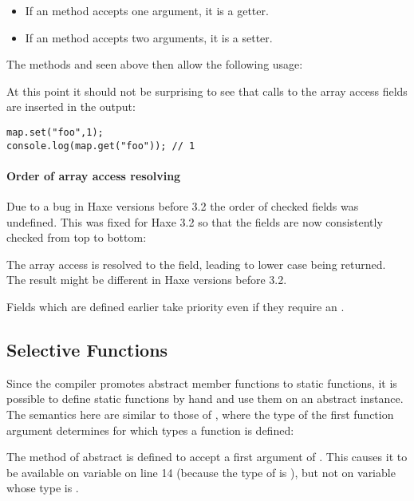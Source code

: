 \begin{itemize}
	\item If an  method accepts one argument, it is a getter.
	\item If an  method accepts two arguments, it is a setter.
\end{itemize}
The methods  and  seen above then allow the following usage:


At this point it should not be surprising to see that calls to the array access fields are inserted in the output:

\begin{lstlisting}
map.set("foo",1);
console.log(map.get("foo")); // 1
\end{lstlisting}

\paragraph{Order of array access resolving}
\label{types-abstract-array-access-order}

Due to a bug in Haxe versions before 3.2 the order of checked  fields was undefined. This was fixed for Haxe 3.2 so that the fields are now consistently checked from top to bottom:


The array access  is resolved to the  field, leading to lower case  being returned. The result might be different in Haxe versions before 3.2.

Fields which are defined earlier take priority even if they require an .


\subsection{Selective Functions}
\label{types-abstract-selective-functions}

Since the compiler promotes abstract member functions to static functions, it is possible to define static functions by hand and use them on an abstract instance. The semantics here are similar to those of , where the type of the first function argument determines for which types a function is defined:

The method  of abstract  is defined to accept a first argument of . This causes it to be available on variable  on line 14 (because the type of  is ), but not on variable  whose type is .

